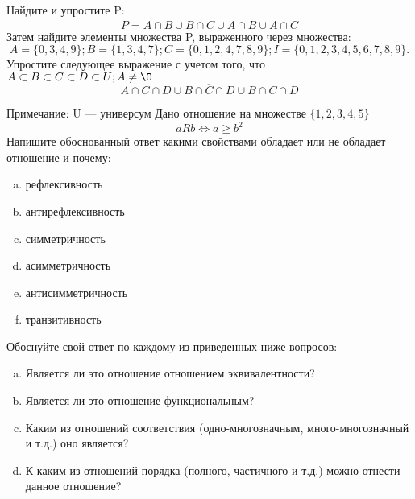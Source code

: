 \documentclass[10pt]{exam}
\begin{document}
\begin{questions}
\question
Найдите и упростите P:
\begin{equation*}
\overline{P} = A \cap \overline{B} \cup \overline{B} \cap C \cup \overline{A} \cap \overline{B} \cup \overline{A} \cap C
\end{equation*}
Затем найдите элементы множества P, выраженного через множества:
\begin{equation*}
A = \{0, 3, 4, 9\}; 
B = \{1, 3, 4, 7\};
C = \{0, 1, 2, 4, 7, 8, 9\};
I = \{0, 1, 2, 3, 4, 5, 6, 7, 8, 9\}.
\end{equation*}\question
Упростите следующее выражение с учетом того, что $A\subset B \subset C \subset D \subset U; A \neq \O$
\begin{equation*}
A \cap C  \cap D \cup B \cap \overline{C} \cap D \cup B \cap C \cap D
\end{equation*}

Примечание: U — универсум\question
Дано отношение на множестве $\{1, 2, 3, 4, 5\}$ 
\begin{equation*}
aRb \iff a \geq b^2
\end{equation*}
Напишите обоснованный ответ какими свойствами обладает или не обладает отношение и почему:   
\begin{enumerate} [a)]\setcounter{enumi}{0}
\item рефлексивность
\item антирефлексивность
\item симметричность
\item асимметричность
\item антисимметричность
\item транзитивность
\end{enumerate}

Обоснуйте свой ответ по каждому из приведенных ниже вопросов:
\begin{enumerate} [a)]\setcounter{enumi}{0}
    \item Является ли это отношение отношением эквивалентности?
    \item Является ли это отношение функциональным?
    \item Каким из отношений соответствия (одно-многозначным, много-многозначный и т.д.) оно является?
    \item К каким из отношений порядка (полного, частичного и т.д.) можно отнести данное отношение?
\end{enumerate}



\end{questions}
\end{document}
